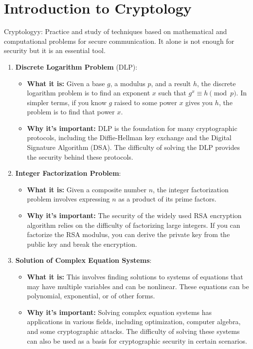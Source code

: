 \documentclass[12pt]{article}
\begin{document}
\section*{Introduction to Cryptology}

Cryptologyy: Practice and study of techniques based on mathematical and computational problems for secure communication. It alone is not enough for security but it is an essential tool.

\begin{enumerate}
    \item \textbf{Discrete Logarithm Problem} (DLP):
    \begin{itemize}
        \item \textbf{What it is:} Given a base \( g \), a modulus \( p \), and a result \( h \), the discrete logarithm problem is to find an exponent \( x \) such that \( g^x \equiv h \pmod{p} \). In simpler terms, if you know \( g \) raised to some power \( x \) gives you \( h \), the problem is to find that power \( x \).
        \item \textbf{Why it's important:} DLP is the foundation for many cryptographic protocols, including the Diffie-Hellman key exchange and the Digital Signature Algorithm (DSA). The difficulty of solving the DLP provides the security behind these protocols.
    \end{itemize}
    \item \textbf{Integer Factorization Problem}:
    \begin{itemize}
        \item \textbf{What it is:} Given a composite number \( n \), the integer factorization problem involves expressing \( n \) as a product of its prime factors.
        \item \textbf{Why it's important:} The security of the widely used RSA encryption algorithm relies on the difficulty of factorizing large integers. If you can factorize the RSA modulus, you can derive the private key from the public key and break the encryption.
    \end{itemize}
    \item \textbf{Solution of Complex Equation Systems}:
    \begin{itemize}
        \item \textbf{What it is:} This involves finding solutions to systems of equations that may have multiple variables and can be nonlinear. These equations can be polynomial, exponential, or of other forms.
        \item \textbf{Why it's important:} Solving complex equation systems has applications in various fields, including optimization, computer algebra, and some cryptographic attacks. The difficulty of solving these systems can also be used as a basis for cryptographic security in certain scenarios.
    \end{itemize}
\end{enumerate}
\end{document}
